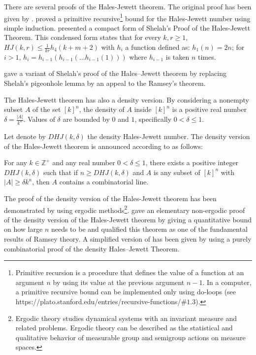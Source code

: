 There are several proofs of the Hales-Jewett theorem. The original proof has been given by \cite{hales1987regularity}. \cite{shelah1988primitive} proved a primitive recursive\footnote{Primitive recursion is a procedure that defines the value of a function at an argument $n$ by using its value at the previous argument $n-1$.  In a computer, a primitive recursive bound can be implemented only using do-loops (see https://plato.stanford.edu/entries/recursive-functions/$\#1.3$).} bound for the Hales-Jewett number using simple induction.
\cite{nilli1990shelah} presented a compact form of Shelah’s Proof of the Hales-Jewett Theorem.  This condensed form states that for every $k,r \geq 1$, $HJ(k,r) \leq \frac{1}{kr} h_4 (k+m+2)$ with $h_i$  a function defined as: $h_1(n)=2n$; for $i>1$, $h_i=h_{i-1}(h_{i-1}(\ldots h_{i-1}(1))) $ where $h_{i-1}$  is taken  $n$ times.

 \cite{matet2007shelah} gave a variant of Shelah’s proof of the Hales–Jewett theorem by replacing Shelah’s pigeonhole lemma by an appeal to the Ramsey’s theorem.

The Hales-Jewett theorem has also a density version. By considering a nonempty subset  $A$ of the set $[k]^n$, the density of $A$ inside $[k]^n$ is a positive real number $\delta=\frac{|A|}{k^n}$. Values of $\delta$ are bounded by $0$ and $1$, specifically  $0< \delta \leq 1.$ 

Let denote by $DHJ(k, \delta)$ the density Hales-Jewett number. The density version of the Hales-Jewett theorem is announced according to \cite{polymath2012new} as follows:

\begin{thm}   For any $k \in \mathbb{Z}^+$ and any real number $0< \delta \leq 1$,  there exists a positive integer $DHJ(k, \delta)$ such that if $n \geq DHJ(k,\delta)$ and $A$ is any subset of $[k] ^n$ with $|A| \geq \delta k^n$, then $A$ contains a combinatorial line.  \label{hj2}	\end{thm}

The proof of the density version of the Hales-Jewett theorem has been demonstrated by \cite{furstenberg1991density} using ergodic methods\footnote{Ergodic theory studies dynamical systems with an invariant measure and related problems. Ergodic theory can be described as the statistical and qualitative behavior of measurable group and semigroup actions on measure spaces.}. \cite{polymath2012new} gave an elementary non-ergodic proof of the density version of the Hales-Jewett theorem by giving a quantitative bound on how large $n$ needs to be and qualified this theorem as one of the fundamental results of Ramsey theory. A simplified version of \cite{polymath2012new} has been given by \cite{dodos2013simple} using  a purely combinatorial proof of the density Hales–Jewett Theorem.

